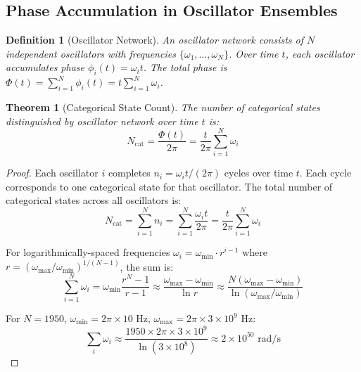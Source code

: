 \documentclass[twocolumn,10pt]{article}
\newtheorem{theorem}{Theorem}[section]
\newtheorem{definition}{Definition}[section]
\begin{document}
\subsection{Phase Accumulation in Oscillator Ensembles}

\begin{definition}[Oscillator Network]
An oscillator network consists of $N$ independent oscillators with frequencies $\{\omega_1, \ldots, \omega_N\}$. Over time $t$, each oscillator accumulates phase $\phi_i(t) = \omega_i t$. The total phase is $\Phi(t) = \sum_{i=1}^N \phi_i(t) = t\sum_{i=1}^N \omega_i$.
\end{definition}

\begin{theorem}[Categorical State Count]
\label{thm:categorical_count}
The number of categorical states distinguished by oscillator network over time $t$ is:
\begin{equation}
N_{\text{cat}} = \frac{\Phi(t)}{2\pi} = \frac{t}{2\pi}\sum_{i=1}^N \omega_i
\end{equation}
\end{theorem}

\begin{proof}
Each oscillator $i$ completes $n_i = \omega_i t/(2\pi)$ cycles over time $t$. Each cycle corresponds to one categorical state for that oscillator. The total number of categorical states across all oscillators is:
\begin{equation}
N_{\text{cat}} = \sum_{i=1}^N n_i = \sum_{i=1}^N \frac{\omega_i t}{2\pi} = \frac{t}{2\pi}\sum_{i=1}^N \omega_i
\end{equation}

For logarithmically-spaced frequencies $\omega_i = \omega_{\min} \cdot r^{i-1}$ where $r = (\omega_{\max}/\omega_{\min})^{1/(N-1)}$, the sum is:
\begin{equation}
\sum_{i=1}^N \omega_i = \omega_{\min} \frac{r^N - 1}{r - 1} \approx \frac{\omega_{\max} - \omega_{\min}}{\ln r} \approx \frac{N(\omega_{\max} - \omega_{\min})}{\ln(\omega_{\max}/\omega_{\min})}
\end{equation}

For $N = 1950$, $\omega_{\min} = 2\pi \times 10$ Hz, $\omega_{\max} = 2\pi \times 3 \times 10^9$ Hz:
\begin{equation}
\sum_i \omega_i \approx \frac{1950 \times 2\pi \times 3 \times 10^9}{\ln(3 \times 10^8)} \approx 2 \times 10^{50} \text{ rad/s}
\end{equation}
\end{proof}
\end{document}
